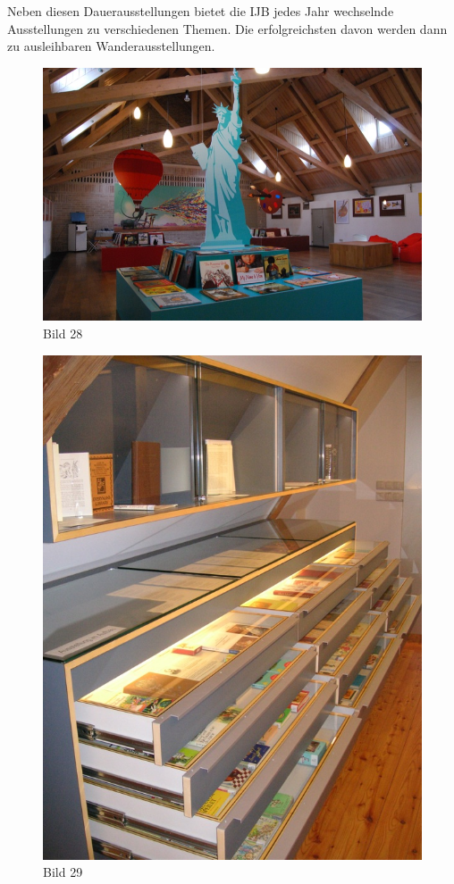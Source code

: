 \documentclass[a4paper,
fontsize=11pt,
oneside,
numbers=noperiodatend,
parskip=half-,
bibliography=totoc,
final
]{scrartcl}
\begin{document}
Neben diesen Dauerausstellungen bietet die IJB jedes Jahr wechselnde
Ausstellungen zu verschiedenen Themen. Die erfolgreichsten davon werden
dann zu ausleihbaren Wanderausstellungen.

\begin{figure}[htbp]
\centering
\includegraphics{img/Bild28.jpg}
\caption{Bild 28}
\end{figure}

\begin{figure}[htbp]
\centering
\includegraphics{img/Bild29.jpg}
\caption{Bild 29}
\end{figure}
\end{document}
